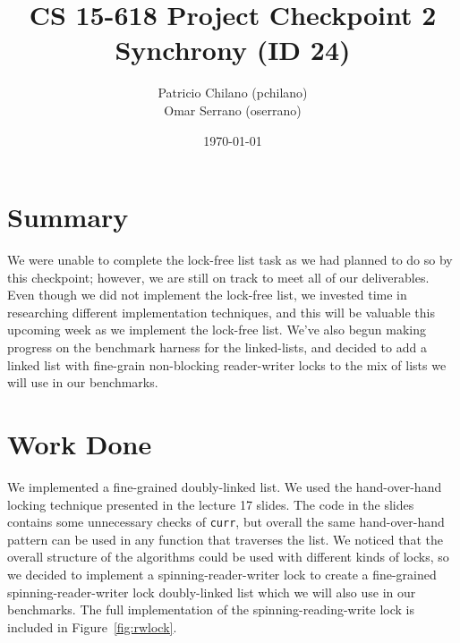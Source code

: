 \documentclass[11pt]{article}
\title{\vspace{-25pt}
\huge CS 15-618 Project Checkpoint 2 \\
\huge Synchrony (ID 24)
}
\author{
    Patricio Chilano (pchilano) \\
    Omar Serrano (oserrano)
}
\date{\today}
\begin{document}


\maketitle

\section*{Summary}
We were unable to complete the lock-free list task as we had planned to do so by
this checkpoint; however, we are still on track to meet all of our deliverables.
Even though we did not implement the lock-free list, we invested time in
researching different implementation techniques, and this will be valuable this
upcoming week as we implement the lock-free list. We've also begun making
progress on the benchmark harness for the linked-lists, and decided to add a
linked list with fine-grain non-blocking reader-writer locks to the mix of lists
we will use in our benchmarks.

\section*{Work Done}
We implemented a fine-grained doubly-linked list. We used the hand-over-hand
locking technique presented in the lecture 17 slides. The code in the slides
contains some unnecessary checks of {\tt curr}, but overall the same
hand-over-hand pattern can be used in any function that traverses the list. We
noticed that the overall structure of the algorithms could be used with
different kinds of locks, so we decided to implement a spinning-reader-writer
lock to create a fine-grained spinning-reader-writer lock doubly-linked list
which we will also use in our benchmarks. The full implementation of the
spinning-reading-write lock is included in Figure~\ref{fig:rwlock}.
\end{document}
